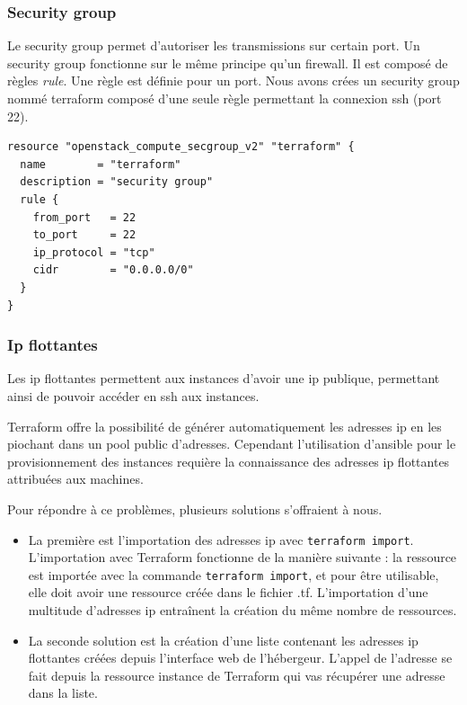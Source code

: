 \documentclass[]{article}
\begin{document}
\subsubsection{Security group}\label{security-group}

Le security group permet d'autoriser les transmissions sur certain port.
Un security group fonctionne sur le même principe qu'un firewall. Il est
composé de règles \emph{rule}. Une règle est définie pour un port. Nous
avons crées un security group nommé \og terraform
\fg composé d'une seule règle permettant la connexion ssh
(port 22).
\begin{verbatim}
resource "openstack_compute_secgroup_v2" "terraform" {
  name        = "terraform"
  description = "security group"
  rule {
    from_port   = 22
    to_port     = 22
    ip_protocol = "tcp"
    cidr        = "0.0.0.0/0"
  }
}
\end{verbatim}

\subsubsection{Ip flottantes}\label{ip-flottantes}

Les ip flottantes permettent aux instances d'avoir une ip publique, permettant ainsi de pouvoir accéder en ssh aux instances.

Terraform offre la possibilité de générer automatiquement les adresses ip en les
piochant dans un pool public d'adresses. Cependant l'utilisation
d'ansible pour le provisionnement des instances requière la connaissance des adresses ip flottantes attribuées aux machines.

Pour répondre à ce problèmes, plusieurs solutions s'offraient à nous. 
\begin{itemize}
\item La première est l'importation des adresses ip avec
\texttt{terraform\ import}. \\
L'importation avec Terraform fonctionne de la manière
suivante : la ressource est importée avec la commande \texttt{terraform\ import}, et pour être
utilisable, elle doit avoir une ressource créée dans le fichier .tf.
L'importation d'une multitude d'adresses ip entraînent la création du
même nombre de ressources. 
\item La seconde solution est la création d'une liste contenant
les adresses ip flottantes créées depuis l'interface web de l'hébergeur.
L'appel de l'adresse se fait depuis la ressource instance de Terraform
qui vas récupérer une adresse dans la liste.
\end{itemize}
\end{document}
